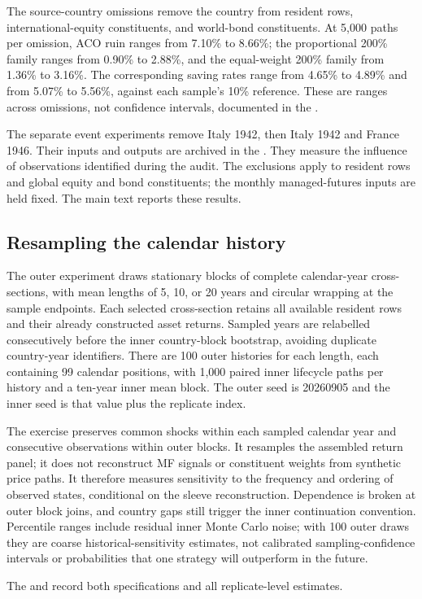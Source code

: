 The source-country omissions remove the country from resident
rows, international-equity constituents, and world-bond constituents.
At 5,000 paths per omission, ACO ruin ranges from 7.10\% to 8.66\%;
the proportional 200\% family ranges from 0.90\% to 2.88\%, and the
equal-weight 200\% family from 1.36\% to 3.16\%.
The corresponding saving rates range from 4.65\% to 4.89\% and from
5.07\% to 5.56\%, against each sample's 10\% reference.
These are ranges across omissions, not confidence intervals, documented in the
.

The separate event experiments remove Italy 1942, then Italy 1942 and
France 1946.
Their inputs and outputs are archived in the
.
They measure the influence of observations identified during the audit.
The exclusions apply to resident rows and global equity and bond
constituents; the monthly managed-futures inputs are held fixed. The main text reports these results.

\subsection{Resampling the calendar history}
The outer experiment draws stationary blocks of complete calendar-year
cross-sections, with mean lengths of 5, 10, or 20 years and circular wrapping
at the sample endpoints. Each selected cross-section retains all available
resident rows and their already constructed asset returns. Sampled years are
relabelled consecutively before the inner country-block bootstrap, avoiding
duplicate country-year identifiers. There are 100 outer histories for each
length, each containing 99 calendar positions, with 1,000 paired inner
lifecycle paths per history and a ten-year inner mean block. The outer seed
is 20260905 and the inner seed is that value plus the replicate index.

The exercise preserves common shocks within each sampled calendar year and
consecutive observations within outer blocks. It resamples the assembled
return panel; it does not reconstruct MF signals or constituent weights from
synthetic price paths. It therefore measures sensitivity to the frequency and
ordering of observed states, conditional on the sleeve reconstruction.
Dependence is broken at outer block joins, and country gaps still trigger
the inner continuation convention. Percentile ranges include residual inner
Monte Carlo noise; with 100 outer draws they are coarse historical-sensitivity
estimates, not calibrated sampling-confidence intervals or probabilities
that one strategy will outperform in the future.

The 
and 
record both specifications and all replicate-level estimates.


